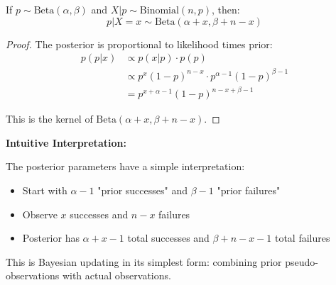 \begin{theorem}
If $p \sim \text{Beta}(\alpha, \beta)$ and $X | p \sim \text{Binomial}(n, p)$, then:
\begin{equation}
p | X=x \sim \text{Beta}(\alpha + x, \beta + n - x)
\end{equation}
\end{theorem}

\begin{proof}
The posterior is proportional to likelihood times prior:
\begin{align}
p(p | x) &\propto p(x | p) \cdot p(p) \\
&\propto p^x (1-p)^{n-x} \cdot p^{\alpha-1}(1-p)^{\beta-1} \\
&= p^{x + \alpha - 1}(1-p)^{n - x + \beta - 1}
\end{align}

This is the kernel of $\text{Beta}(\alpha + x, \beta + n - x)$.
\end{proof}

\textbf{Intuitive Interpretation:}

The posterior parameters have a simple interpretation:
\begin{itemize}
    \item Start with $\alpha - 1$ "prior successes" and $\beta - 1$ "prior failures"
    \item Observe $x$ successes and $n - x$ failures
    \item Posterior has $\alpha + x - 1$ total successes and $\beta + n - x - 1$ total failures
\end{itemize}

This is Bayesian updating in its simplest form: combining prior pseudo-observations with actual observations.

